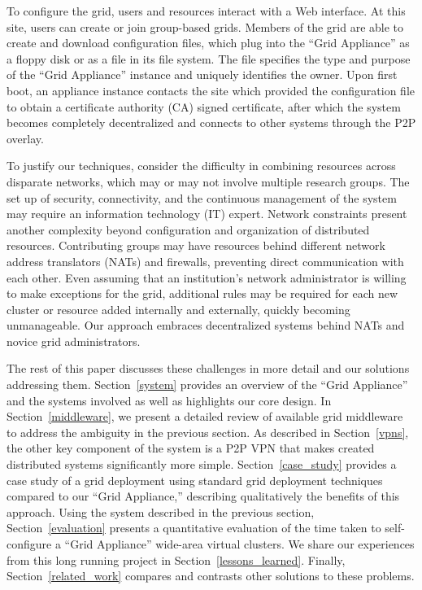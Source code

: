 \documentclass[conference]{IEEEtran}
\begin{document}
To configure the grid, users and resources interact with a Web interface.  At
this site, users can create or join group-based grids.  Members of the grid are
able to create and download configuration files, which plug into the ``Grid
Appliance'' as a floppy disk or as a file in its file system.  The file
specifies the type and purpose of the ``Grid Appliance'' instance and uniquely
identifies the owner.  Upon first boot, an appliance instance contacts the site
which provided the configuration file to obtain a certificate authority (CA)
signed certificate, after which the system becomes completely decentralized and
connects to other systems through the P2P overlay.  

To justify our techniques, consider the difficulty in combining resources
across disparate networks, which may or may not involve multiple research
groups.  The set up of security, connectivity, and the continuous management of
the system may require an information technology (IT) expert.  Network
constraints present another complexity beyond configuration and organization of
distributed resources.  Contributing groups may have resources behind different
network address translators (NATs) and firewalls, preventing direct
communication with each other.  Even assuming that an institution's network
administrator is willing to make exceptions for the grid, additional rules may
be required for each new cluster or resource added internally and externally,
quickly becoming unmanageable.  Our approach embraces decentralized systems
behind NATs and novice grid administrators.

The rest of this paper discusses these challenges in more detail and our
solutions addressing them.  Section~\ref{system} provides an overview of the
``Grid Appliance'' and the systems involved as well as highlights our core
design.  In Section~\ref{middleware}, we present a detailed review of available
grid middleware to address the ambiguity in the previous section.  As described
in Section~\ref{vpns}, the other key component of the system is a P2P VPN that
makes created distributed systems significantly more simple.
Section~\ref{case_study} provides a case study of a grid deployment using
standard grid deployment techniques compared to our ``Grid Appliance,''
describing qualitatively  the benefits of this approach.  Using the system
described in the previous section, Section~\ref{evaluation} presents a
quantitative evaluation of the time taken to self-configure a ``Grid
Appliance'' wide-area virtual clusters.  We share our experiences from this
long running project in Section~\ref{lessons_learned}.  Finally,
Section~\ref{related_work} compares and contrasts other solutions to these
problems.
\end{document}

